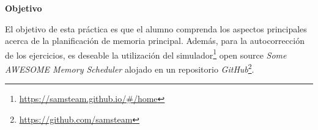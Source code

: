 \documentclass[a4paper,11pt]{exam}
\begin{document}
\maketitle

\textbf{Objetivo}

El objetivo de esta práctica es que el alumno comprenda los aspectos principales acerca de la planificación de memoria principal. Además, para la autocorrección de los ejercicios, es deseable la utilización del simulador\footnote{\url{https://samsteam.github.io/\#/home}} open source \emph{Some AWESOME Memory Scheduler} alojado en un repositorio \emph{GitHub}\footnote{\url{https://github.com/samsteam}}.


\end{document}
